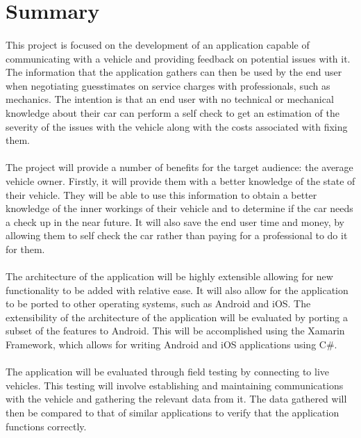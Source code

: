 \section{Summary}
	\paragraph{}{
	This project is focused on the development of an application capable of communicating with a vehicle and providing feedback on potential issues with it. The information that the application gathers can then be used by the end user when negotiating guesstimates on service charges with professionals, such as mechanics. The intention is that an end user with no technical or mechanical knowledge about their car can perform a self check to get an estimation of the severity of the issues with the vehicle along with the costs associated with fixing them.
	}
	\paragraph{}{
	The project will provide a number of benefits for the target audience: the average vehicle owner. Firstly, it will provide them with a better knowledge of the state of their vehicle. They will be able to use this information to obtain a better knowledge of the inner workings of their vehicle and to determine if the car needs a check up in the near future. It will also save the end user time and money, by allowing them to self check the car rather than paying for a professional to do it for them.
	}
	\paragraph{}
	{
	The architecture of the application will be highly extensible allowing for new functionality to be added with relative ease. It will also allow for the application to be ported to other operating systems, such as Android and iOS. The extensibility of the architecture of the application will be evaluated by porting a subset of the features to Android. This will be accomplished using the Xamarin Framework, which allows for writing Android and iOS applications using C{\#}.
	}
	\paragraph{}
	{
	The application will be evaluated through field testing by connecting to live vehicles. This testing will involve establishing and maintaining communications with the vehicle and gathering the relevant data from it. The data gathered will then be compared to that of similar applications to verify that the application functions correctly.
	}
	
